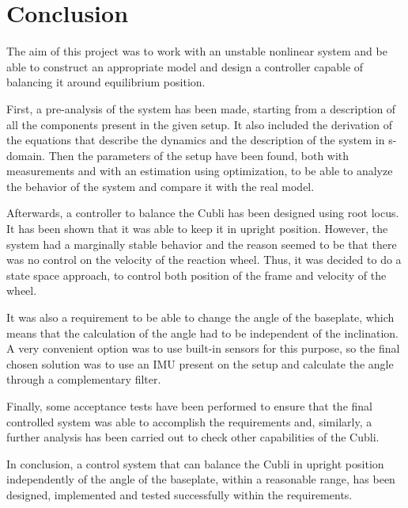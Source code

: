 \chapter{Conclusion}

The aim of this project was to work with an unstable nonlinear system and be able to construct an appropriate model and design a controller capable of balancing it around equilibrium position.

First, a pre-analysis of the system has been made, starting from a description of all the components present in the given setup. It also included the derivation of the equations that describe the dynamics and the description of the system in s-domain. Then the parameters of the setup have been found, both with measurements and with an estimation using optimization, to be able to analyze the behavior of the system and compare it with the real model.

Afterwards, a controller to balance the Cubli has been designed using root locus. It has been shown that it was able to keep it in upright position. However, the system had a marginally stable behavior and the reason seemed to be that there was no control on the velocity of the reaction wheel. Thus, it was decided to do a state space approach, to control both position of the frame and velocity of the wheel.

It was also a requirement to be able to change the angle of the baseplate, which means that the calculation of the angle had to be independent of the inclination. A very convenient option was to use built-in sensors for this purpose, so the final chosen solution was to use an IMU present on the setup and calculate the angle through a complementary filter.

Finally, some acceptance tests have been performed to ensure that the final controlled system was able to accomplish the requirements and, similarly, a further analysis has been carried out to check other capabilities of the Cubli.

In conclusion, a control system that can balance the Cubli in upright position independently of the angle of the baseplate, within a reasonable range, has been designed, implemented and tested successfully within the requirements.


